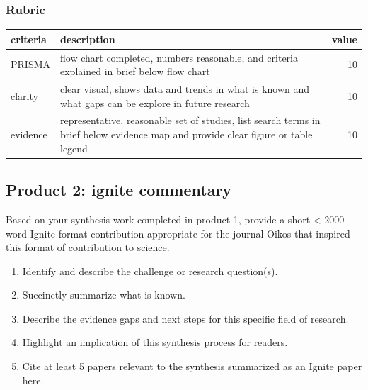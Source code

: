 \documentclass[
]{book}
\providecommand{\tightlist}{%
  \setlength{\itemsep}{0pt}\setlength{\parskip}{0pt}}
\begin{document}
\hypertarget{rubric}{%
\subsubsection*{Rubric}\label{rubric}}

\begin{tabular}{llr}
\toprule
criteria & description & value\\
\midrule
PRISMA & flow chart completed, numbers reasonable, and criteria explained in brief below flow chart & 10\\
clarity & clear visual, shows data and trends in what is known and what gaps can be explore in future research & 10\\
evidence & representative, reasonable set of studies, list search terms in brief below evidence map and provide clear figure or table legend & 10\\
\bottomrule
\end{tabular}

\hypertarget{product-2-ignite-commentary}{%
\subsection*{Product 2: ignite commentary}\label{product-2-ignite-commentary}}

Based on your synthesis work completed in product 1, provide a short \textless{} 2000 word Ignite format contribution appropriate for the journal Oikos that inspired this \href{https://www.oikosjournal.org/authors/author-guidelines}{format of contribution} to science.

\begin{enumerate}
\def\labelenumi{\arabic{enumi}.}
\tightlist
\item
  Identify and describe the challenge or research question(s).\\
\item
  Succinctly summarize what is known.\\
\item
  Describe the evidence gaps and next steps for this specific field of research.\\
\item
  Highlight an implication of this synthesis process for readers.\\
\item
  Cite at least 5 papers relevant to the synthesis summarized as an Ignite paper here.
\end{enumerate}
\end{document}
